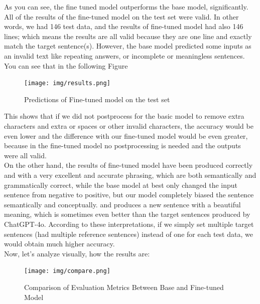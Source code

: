 \documentclass{solutionclass} %
\begin{document}
\begin{solution}
As you can see, the fine tuned model outperforms the base model, significantly. All of the results of the fine-tuned model on the test set were valid. In other words, we had 146 test data, and the results of fine-tuned model had also 146 lines; which means the results are all valid because they are one line and exactly match the target sentence(s). However, the base model predicted some inputs as an invalid text like repeating answers, or incomplete or meaningless sentences. You can see that in the following Figure
\end{solution}

\begin{figure}[H]
	\centering
	\texttt{[image: img/results.png]}
	\caption{Predictions of Fine-tuned model on the test set}
\end{figure}

\begin{solution}
This shows that if we did not postprocess for the basic model to remove extra characters and extra or spaces or other invalid characters, the accuracy would be even lower and the difference with our fine-tuned model would be even greater, because in the fine-tuned model no postprocessing is needed and the outputs were all valid.\\

On the other hand, the results of fine-tuned model have been produced correctly and with a very excellent and accurate phrasing, which are both semantically and grammatically correct, while the base model at best only changed the input sentence from negative to positive, but our model completely biased the sentence semantically and conceptually. and produces a new sentence with a beautiful meaning, which is sometimes even better than the target sentences produced by ChatGPT-4o. According to these interpretations, if we simply set multiple target sentences (had multiple reference sentences) instead of one for each test data, we would obtain much higher accuracy.\\

Now, let's analyze visually, how the results are:
\end{solution}

\begin{figure}[H]
	\centering
	\texttt{[image: img/compare.png]}
	\caption{Comparison of Evaluation Metrics Between Base and Fine-tuned Model}
\end{figure}
\end{document}
